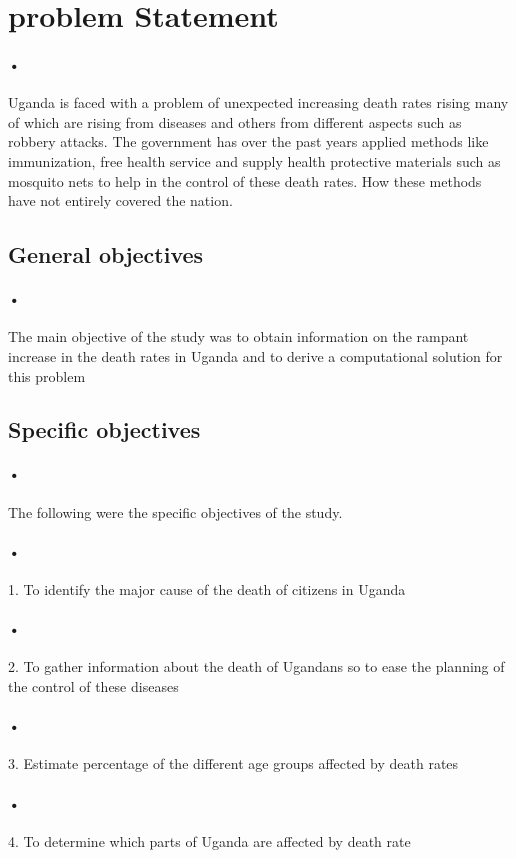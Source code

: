 \documentclass[12pt]{article}
\begin{document}
\section{ problem Statement}
\paragraph{•}Uganda is faced with a problem of unexpected increasing death rates rising many of which are rising from diseases and others from different aspects such as robbery attacks. The government has over the past years applied methods like immunization, free health service and supply health protective materials such as mosquito nets to help in the control of these death rates. How these methods have not entirely covered the nation.

\subsection{General objectives }
\paragraph{•}The main objective of the study was to obtain information on the rampant increase in the death rates in Uganda and to derive a computational solution for this problem
\subsection{Specific objectives }
\paragraph{•}The following were the specific objectives of the study.
\paragraph{•} 1.	To identify the major cause of the death of citizens in Uganda 
\paragraph{•}2.	To gather information about the death of Ugandans so to ease the planning of the control of these diseases
\paragraph{•}3.	Estimate percentage of the different age groups affected by death rates
\paragraph{•}4.	To determine which parts of Uganda are affected by death rate
\end{document}
